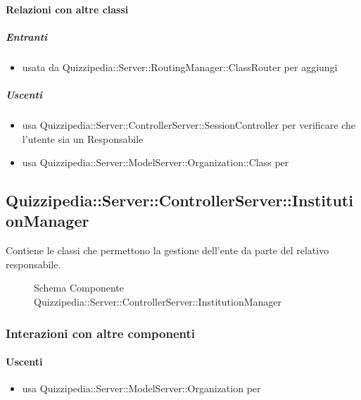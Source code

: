 \paragraph{Relazioni con altre classi}
\subparagraph{Entranti}
\begin{itemize}
\item usata da Quizzipedia::Server::RoutingManager::ClassRouter per aggiungi
\end{itemize}
\subparagraph{Uscenti}
\begin{itemize}
\item usa Quizzipedia::Server::ControllerServer::SessionController per verificare che l'utente sia un Responsabile
\item usa Quizzipedia::Server::ModelServer::Organization::Class per 
\end{itemize}
\subsection{Quizzipedia::Server::ControllerServer::InstitutionManager}
Contiene le classi che permettono la gestione dell'ente da parte del relativo responsabile.
\begin{figure}[H]
\centering
\noindent{}
\caption[Schema Componente Quizzipedia::Server::ControllerServer::InstitutionManager]{Schema Componente Quizzipedia::Server::ControllerServer::InstitutionManager}
\end{figure}
\subsubsection{Interazioni con altre componenti}
\paragraph{Uscenti}
\begin{itemize}
\item usa Quizzipedia::Server::ModelServer::Organization per 
\end{itemize}
